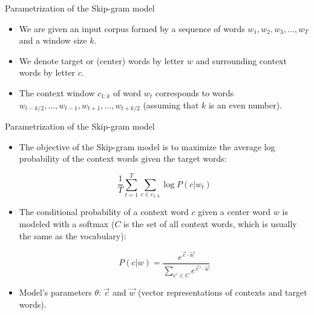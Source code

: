 \documentclass[handout]{beamer}
\begin{document}

\begin{frame}{Parametrization of the Skip-gram model}
\begin{scriptsize}
\begin{itemize}

\item  We are given an input corpus formed by a sequence of  words $w_1, w_2, w_3, . . . , w_T$ and a window size $k$.

\item We denote target or (center) words by letter $w$ and surrounding context words by letter $c$.

\item The context window $c_{1:k}$ of word $w_t$ corresponds to words $w_{t-k/2},\dots, w_{t-1}, w_{t+1}, \dots, w_{t+k/2}$ (assuming that $k$ is an even number). 

\end{itemize}
\end{scriptsize}
\end{frame}


\begin{frame}{Parametrization of the Skip-gram model}
\begin{scriptsize}
\begin{itemize}

\item The objective of the Skip-gram model is to maximize the average log probability of the context words given the target words:

\begin{displaymath}
 \frac{1}{T} \sum_{t=1}^T \sum_{c \in c_{1:k}}  \log P(c|w_t)
\end{displaymath}


\item The conditional probability of a context word $c$ given a center word $w$ is modeled with a softmax ($C$ is the set of all context words, which is usually the same as the vocabulary):


\begin{displaymath}
P(c|w) = \frac{e^{\vec{c}\cdot \vec{w}}}{ \sum_{c'\in C} e^{\vec{c}'\cdot \vec{w}}}
\end{displaymath}

\item Model's parameters $\theta$: $\vec{c}$ and $\vec{w}$ (vector representations of contexts and target words).

\end{itemize}
\end{scriptsize}
\end{frame}
\end{document}
